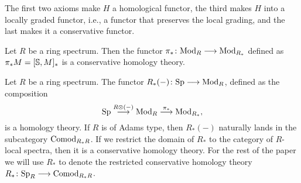 \begin{remark}
    The first two axioms make $H$ a homological functor, the third makes $H$ into a locally graded functor, i.e., a functor that preserves the local grading, and the last makes it a conservative functor. 
\end{remark}

\begin{example}
    Let $R$ be a ring spectrum. Then the functor $\pi_*\colon \Mod_R\longrightarrow \Mod_{R_*}$ defined as $\pi_* M = [\S, M]_*$ is a conservative homology theory. 
\end{example}

\begin{example}
    Let $R$ be a ring spectrum. The functor $R_*(-)\colon \Sp \longrightarrow \Mod_R$, defined as the composition 
    $$\Sp\overset{R\otimes (-)}\longrightarrow \Mod_R \overset{\pi_*}\longrightarrow \Mod_{R_*},$$
    is a homology theory. If $R$ is of Adams type, then $R_*(-)$ naturally lands in the subcategory $\Comod_{R_*R}$. If we restrict the domain of $R_*$ to the category of $R$-local spectra, then it is a conservative homology theory. For the rest of the paper we will use $R_*$ to denote the restricted conservative homology theory $R_*\colon \Sp_R\to \Comod_{R_*R}$.
\end{example}

